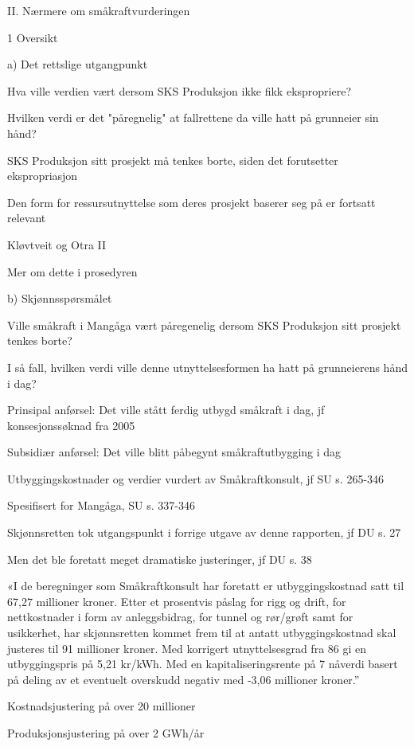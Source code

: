 \documentclass[12pt,a4paper]{article} %
\begin{document}
II.	Nærmere om småkraftvurderingen

1	Oversikt

a)	Det rettslige utgangpunkt

	Hva ville verdien vært dersom SKS Produksjon ikke fikk ekspropriere?

	Hvilken verdi er det "påregnelig" at fallrettene da ville hatt på grunneier sin hånd?
	
	SKS Produksjon sitt prosjekt må tenkes borte, siden det forutsetter ekspropriasjon	
	
	Den form for ressursutnyttelse som deres prosjekt baserer seg på er fortsatt relevant

	Kløvtveit og Otra II

	Mer om dette i prosedyren	
	
b)	Skjønnsspørsmålet

	Ville småkraft i Mangåga vært påregenelig dersom SKS Produksjon sitt prosjekt tenkes borte?

	I så fall, hvilken verdi ville denne utnyttelsesformen ha hatt på grunneierens hånd i dag?

	Prinsipal anførsel: Det ville stått ferdig utbygd småkraft i dag, jf konsesjonssøknad fra 2005

	Subsidiær anførsel: Det ville blitt påbegynt småkraftutbygging i dag

	Utbyggingskostnader og verdier vurdert av Småkraftkonsult, jf SU s. 265-346

	Spesifisert for Mangåga, SU s. 337-346

	Skjønnsretten tok utgangspunkt i forrige utgave av denne rapporten, jf DU s. 27

	Men det ble foretatt meget dramatiske justeringer, jf DU s. 38

	«I de beregninger som Småkraftkonsult har foretatt er utbyggingskostnad satt til 67,27 millioner kroner. 
	Etter et prosentvis påslag for rigg og drift, for nettkostnader i form av anleggsbidrag, for tunnel og rør/grøft samt for usikkerhet, 
	har skjønnsretten kommet frem til at antatt utbyggingskostnad skal justeres til 91 millioner kroner. 
	Med korrigert utnyttelsesgrad fra 86 %
	gi en utbyggingspris på 5,21 kr/kWh. Med en kapitaliseringsrente på 7 %
	nåverdi basert på deling av et eventuelt overskudd negativ med -3,06 millioner kroner.”

	Kostnadsjustering på over 20 millioner

	Produksjonsjustering på over 2 GWh/år
\end{document}
